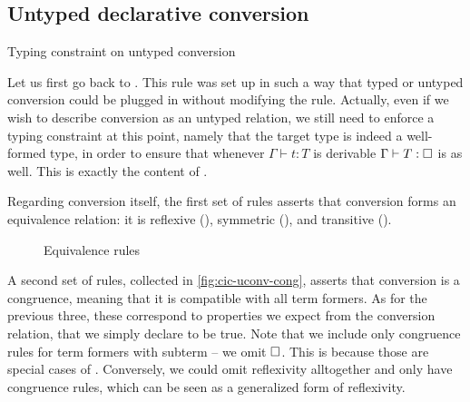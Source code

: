 \subsection{Untyped declarative conversion}

\begin{marginfigure}
  \ContinuedFloat*
  \begin{mathpar}
    \label{rule:cic-conv-unty}
  \end{mathpar}
  \caption{Typing constraint on untyped conversion}
\end{marginfigure}

Let us first go back to .
This rule was set up in such a way that typed or untyped conversion could be plugged in
without modifying the rule.
Actually, even if we wish to describe conversion as
an untyped relation, we still need to enforce a typing constraint at this point,
namely that the target type is indeed a well-formed type,
in order to ensure that whenever $\Gamma \vdash t : T$ is derivable
$\Gamma \vdash T : \uni$ is as well.
This is exactly the content of .

Regarding conversion itself, the first set of rules asserts
that conversion forms an equivalence relation: it
is reflexive (), symmetric (),
and transitive ().

\begin{figure}[h]
  \ContinuedFloat
  \caption{Equivalence rules}
  \label{fig:cic-uconv-equiv}
\end{figure}

A second set of rules, collected in \cref{fig:cic-uconv-cong},
asserts that conversion is a congruence, meaning that it is compatible
with all term formers. As for the previous three, these correspond to properties we expect
from the conversion relation, that we simply declare to be true. Note that we include only
congruence rules for term formers with subterm – we \eg omit $\uni$. This is because
those are special cases of . Conversely, we could omit 
reflexivity alltogether and only have congruence rules, which can be seen as a generalized
form of reflexivity.

